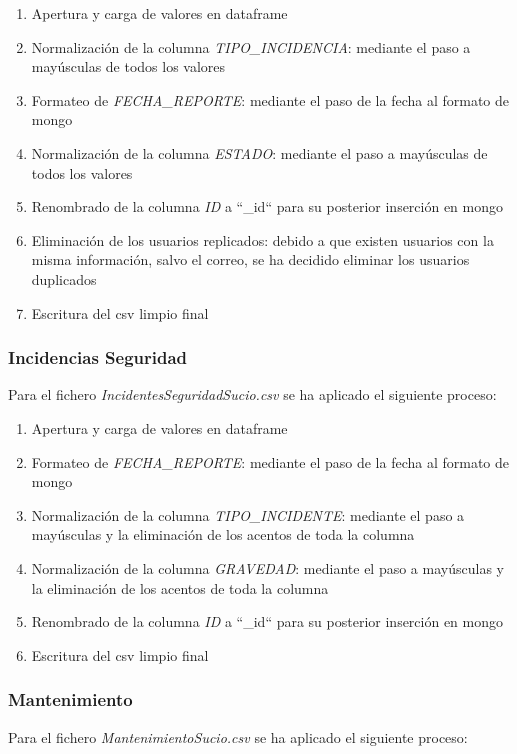 \documentclass[]{article}
\begin{document}
\begin{enumerate}
    \item Apertura y carga de valores en dataframe
    \item Normalización de la columna \textit{TIPO\_INCIDENCIA}: mediante el paso a mayúsculas de todos los valores
    \item Formateo de \textit{FECHA\_REPORTE}: mediante el paso de la fecha al formato de mongo
    \item Normalización de la columna \textit{ESTADO}: mediante el paso a mayúsculas de todos los valores
    \item Renombrado de la columna \textit{ID} a ``\_id`` para su posterior inserción en mongo
    \item Eliminación de los usuarios replicados: debido a que existen usuarios con la misma información, salvo el correo, se ha decidido eliminar los usuarios duplicados
    \item Escritura del csv limpio final
\end{enumerate}

\subsubsection{Incidencias Seguridad}
\label{subsubsec:preprocessincidenciasseguridad}
Para el fichero \textit{IncidentesSeguridadSucio.csv} se ha aplicado el siguiente proceso:

\begin{enumerate}
    \item Apertura y carga de valores en dataframe
    \item Formateo de \textit{FECHA\_REPORTE}: mediante el paso de la fecha al formato de mongo
    \item Normalización de la columna \textit{TIPO\_INCIDENTE}: mediante el paso a mayúsculas y la eliminación de los acentos de toda la columna
    \item Normalización de la columna \textit{GRAVEDAD}: mediante el paso a mayúsculas y la eliminación de los acentos de toda la columna
    \item Renombrado de la columna \textit{ID} a ``\_id`` para su posterior inserción en mongo
    \item Escritura del csv limpio final
\end{enumerate}

\subsubsection{Mantenimiento}
\label{subsubsec:preprocessmantenimiento}
Para el fichero \textit{MantenimientoSucio.csv} se ha aplicado el siguiente proceso:
\end{document}
